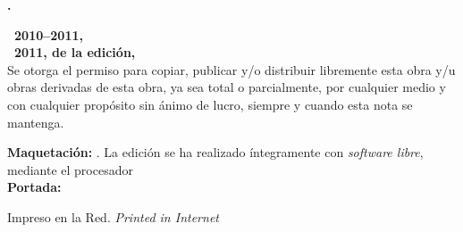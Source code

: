 \noindent
\textbf{\titlename. \subtitlename}\\
\authorname

\bigskip\bigskip\footnotesize\noindent
\textbf{\copyleft\ 2010--2011, \authorname}\\
\textbf{\copyleft\ 2011, de la edición, \editorname}\\
Se otorga el permiso para copiar, publicar y/o distribuir libremente esta obra y/u obras derivadas de esta obra, ya sea total o parcialmente, por cualquier medio y con cualquier propósito sin ánimo de lucro, siempre y cuando esta nota se mantenga.

\bigskip\noindent
\textbf{Maquetación:} \editorname. La edición se ha realizado íntegramente con \emph{software libre}, mediante el procesador \emph{\LaTeXe}\\
\textbf{Portada:} \coverauthorname

\bigskip\noindent
Impreso en la Red. \emph{Printed in Internet}
\normalsize
{}

\endinput
